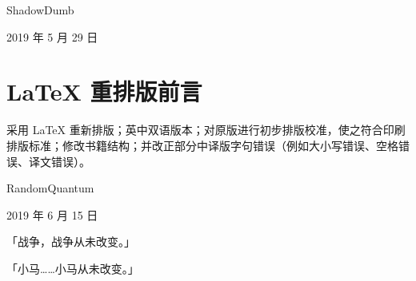 \begin{flushright}
ShadowDumb

2019 年 5 月 29 日
\end{flushright}

\clearpage

\section*{\LaTeX{} 重排版前言}

采用 \LaTeX{} 重新排版；英中双语版本；对原版进行初步排版校准，使之符合印刷排版标准；修改书籍结构；并改正部分中译版字句错误（例如大小写错误、空格错误、译文错误）。

\begin{flushright}
RandomQuantum

2019 年 6 月 15 日
\end{flushright}


\begin{motto}
「战争，战争从未改变。」

\medskip

「小马……小马从未改变。」
\end{motto}

